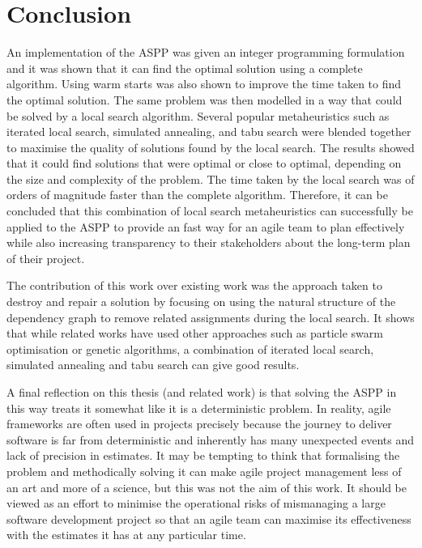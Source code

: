 
\chapter{Conclusion}
\label{ChapterConclusion}

An implementation of the ASPP was given an integer programming formulation and it was shown that it can find the optimal solution using a complete algorithm. Using warm starts was also shown to improve the time taken to find the optimal solution. The same problem was then modelled in a way that could be solved by a local search algorithm. Several popular metaheuristics such as iterated local search, simulated annealing, and tabu search were blended together to maximise the quality of solutions found by the local search. The results showed that it could find solutions that were optimal or close to optimal, depending on the size and complexity of the problem. The time taken by the local search was of orders of magnitude faster than the complete algorithm. Therefore, it can be concluded that this combination of local search metaheuristics can successfully be applied to the ASPP to provide an fast way for an agile team to plan effectively while also increasing transparency to their stakeholders about the long-term plan of their project.

The contribution of this work over existing work was the approach taken to destroy and repair a solution by focusing on using the natural structure of the dependency graph to remove related assignments during the local search. It shows that while related works have used other approaches such as particle swarm optimisation or genetic algorithms, a combination of iterated local search, simulated annealing and tabu search can give good results.

A final reflection on this thesis (and related work) is that solving the ASPP in this way treats it somewhat like it is a deterministic problem. In reality, agile frameworks are often used in projects precisely because the journey to deliver software is far from deterministic and inherently has many unexpected events and lack of precision in estimates. It may be tempting to think that formalising the problem and methodically solving it can make agile project management less of an art and more of a science, but this was not the aim of this work. It should be viewed as an effort to minimise the operational risks of mismanaging a large software development project so that an agile team can maximise its effectiveness with the estimates it has at any particular time.